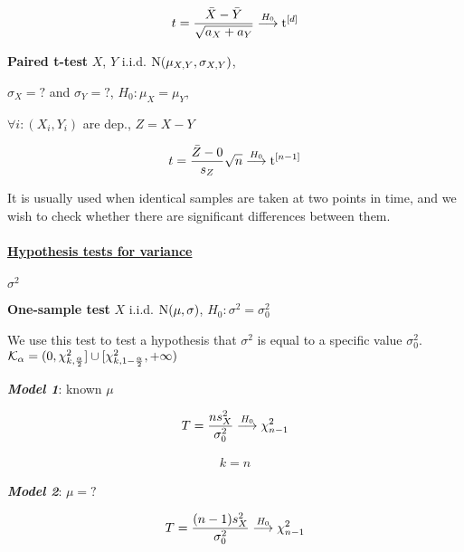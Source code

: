 \vspace{-15pt}
\begin{gather*}
t=\frac{\bar{X}-\bar{Y}}{ \sqrt{ a_X + a_Y } }
\overset{H_0}{\longrightarrow} \textrm{t}^{[d]}
\end{gather*}

\vfill
\columnbreak

\noindent \textbf{Paired t-test}
$X$, $Y$ i.i.d. $\textrm{N}(\mu_{X,Y}, \sigma_{X,Y})$, 

$\sigma_X=?$ and $\sigma_Y=?$, $H_0: \mu_X=\mu_Y$, 

$\forall i: (X_i,Y_i)$ are dep., $Z=X-Y$

\vspace{-15pt}
\begin{gather*}
t= \frac{\bar{Z}-0}{s_Z}\sqrt{n} 
\overset{H_0}{\longrightarrow} \textrm{t}^{[n-1]}
\end{gather*}

It is usually used when identical samples are taken at two points in time, and we wish to check
whether there are significant differences between them.

\paragraph{\underline{Hypothesis tests for variance}}
$\sigma^2$

\vspace{5pt}
\noindent \textbf{One-sample test}
$X$ i.i.d. $\textrm{N}(\mu, \sigma)$, $H_0: \sigma^2=\sigma_0^2$

We use this test to test a hypothesis that $\sigma^2$ is equal to a specific value $\sigma_0^2$.
$ \mathcal{K}_\alpha = (0, \chi^2_{k, \frac{\alpha}{2}}] \cup [\chi^2_{k, 1-\frac{\alpha}{2}}, +\infty) $

\vspace{5pt}
\textbf{\em Model 1}:
known $\mu$

\vspace{-15pt}
\begin{gather*}
T = \frac{n s_X^2}{\sigma_0^2}
\overset{H_0}{\longrightarrow} \chi^2_{n-1}
\end{gather*}

\vspace{-15pt}
\begin{gather*}
k = n
\end{gather*}

\textbf{\em Model 2}:
$\mu=?$

\vspace{-15pt}
\begin{gather*}
T = \frac{(n-1)s_X^2}{\sigma_0^2}
\overset{H_0}{\longrightarrow} \chi^2_{n-1}
\end{gather*}

